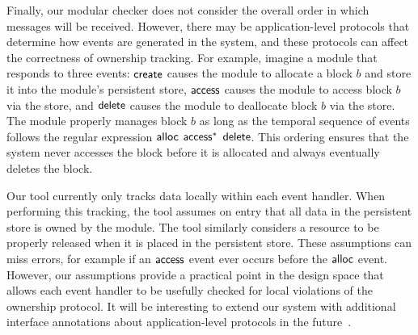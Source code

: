 Finally, our modular checker does not
consider the overall
order in which messages will be received.
However,
there may be application-level protocols that determine how events
are generated in the system, and these protocols can affect the
correctness of ownership tracking.
%
For example, imagine a module that responds to three events:  ${\mathsf{create}}$
causes the module to allocate a block $b$ and store
it into the module's persistent store,
${\mathsf{access}}$ causes the module to access block $b$ via the  store,
and ${\mathsf{delete}}$ causes the module to deallocate block $b$ via the 
store.
The module properly manages block $b$ as long as the temporal
sequence of events follows the regular expression ${\mathsf{alloc}}$ ${\mathsf{access}}^*$
${\mathsf{delete}}$.  This ordering ensures that the system never accesses the
block before it is allocated and always eventually deletes the block.

Our tool currently only
tracks data locally within each event handler.
When performing this tracking, the tool assumes on entry
that all data in the persistent store is owned by the module.  The
tool similarly considers a resource to be properly
released when it is placed in the persistent store.  These
assumptions can miss errors, for example if an ${\mathsf{access}}$ event ever
occurs before the ${\mathsf{alloc}}$ event.  However, our assumptions provide a
practical point in the design space 
that allows each event handler to be usefully checked
for local violations of the ownership protocol.
%
It will be interesting to extend our system with additional interface
annotations about application-level protocols in the future~\cite{AlurPOPL05,HJM05}.



